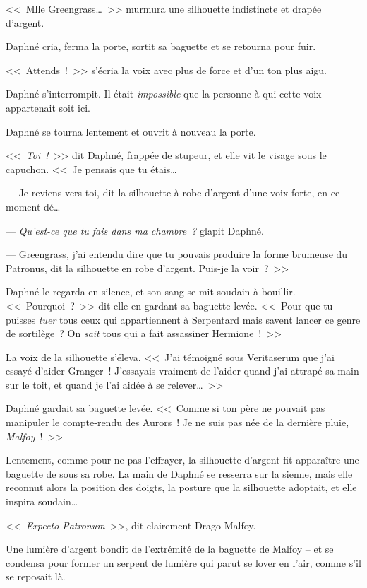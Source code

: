 <<~Mlle Greengrass…~>> murmura une silhouette indistincte et drapée d'argent.

Daphné cria, ferma la porte, sortit sa baguette et se retourna pour fuir.

<<~Attends~!~>> s'écria la voix avec plus de force et d'un ton plus aigu.

Daphné s'interrompit. Il était \emph{impossible} que la personne à qui cette voix appartenait soit ici.

Daphné se tourna lentement et ouvrit à nouveau la porte.

<<~\emph{Toi~!}~>> dit Daphné, frappée de stupeur, et elle vit le visage sous le capuchon. <<~Je pensais que tu étais…

--- Je reviens vers toi, dit la silhouette à robe d'argent d'une voix forte, en ce moment dé…

--- \emph{Qu'est-ce que tu fais dans ma chambre~?} glapit Daphné.

--- Greengrass, j'ai entendu dire que tu pouvais produire la forme brumeuse du Patronus, dit la silhouette en robe d'argent. Puis-je la voir~?~>>

Daphné le regarda en silence, et son sang se mit soudain à bouillir. <<~Pourquoi~?~>> dit-elle en gardant sa baguette levée. <<~Pour que tu puisses \emph{tuer} tous ceux qui appartiennent à Serpentard mais savent lancer ce genre de sortilège~? On \emph{sait} tous qui a fait assassiner Hermione~!~>>

La voix de la silhouette s'éleva. <<~J'ai témoigné sous Veritaserum que j'ai essayé d'aider Granger~! J'essayais vraiment de l'aider quand j'ai attrapé sa main sur le toit, et quand je l'ai aidée à se relever…~>>

Daphné gardait sa baguette levée. <<~Comme si ton père ne pouvait pas manipuler le compte-rendu des Aurors~! Je ne suis pas née de la dernière pluie, \emph{Malfoy}~!~>>

Lentement, comme pour ne pas l'effrayer, la silhouette d'argent fit apparaître une baguette de sous sa robe. La main de Daphné se resserra sur la sienne, mais elle reconnut alors la position des doigts, la posture que la silhouette adoptait, et elle inspira soudain…

<<~\emph{Expecto Patronum}~>>, dit clairement Drago Malfoy.

Une lumière d'argent bondit de l'extrémité de la baguette de Malfoy -- et se condensa pour former un serpent de lumière qui parut se lover en l'air, comme s'il se reposait là.

